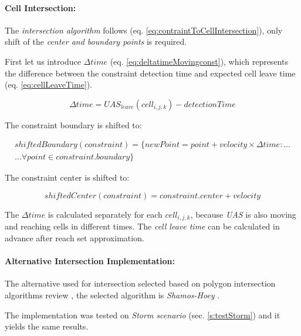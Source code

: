 \paragraph{Cell Intersection:} The \emph{intersection algorithm} follows (eq. \ref{eq:contraintToCellIntersection}), only shift of the \emph{center and boundary points} is required. 

First let us introduce $\Delta time$ (eq. \ref{eq:deltatimeMovingconst}), which represents the difference between the constraint detection time and expected cell leave time (eq. \ref{eq:cellLeaveTime}).

\begin{equation}\label{eq:deltatimeMovingconst}
    \Delta time = UAS_{leave}(cell_{i,j,k}) - detection Time
\end{equation}

\newpage\noindent The constraint boundary is shifted to:

\begin{multline}
    shifted Boundary(constraint) = \{new Point = point + velocity \times \Delta time:\dots\\\dots \forall point \in constraint.boundary \}
\end{multline}

\noindent The constraint center is shifted to:

\begin{equation}
    shifted Center(constraint) = constraint.center + velocity
\end{equation}

\begin{note}
    The $\Delta time$ is calculated separately for each $cell_{i,j,k}$, because \emph{UAS} is also  moving and reaching cells in different times. The \emph{cell leave time} can be calculated in advance after reach set approximation.
\end{note}

\paragraph{Alternative Intersection Implementation:} The alternative used for intersection selected based on polygon intersection algorithms review \citep{bentley1979algorithms}, the selected algorithm  is \emph{Shamos-Hoey} \cite{shamos1976geometric}.

The implementation was tested on \emph{Storm scenario} (sec. \ref{s:testStorm}) and it yields the same results.
